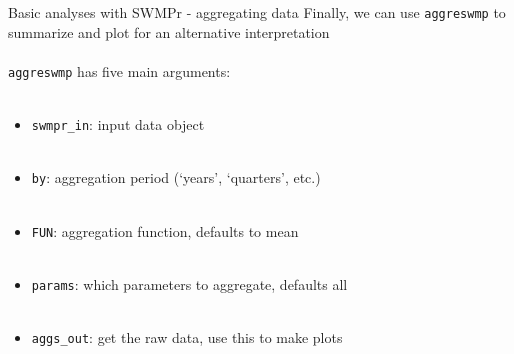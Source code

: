 \documentclass[xcolor=dvipsnames,serif]{beamer}\usepackage[]{graphicx}\usepackage[]{color}
\begin{document}
\begin{frame}[containsverbatim]{Basic analyses with SWMPr - aggregating data}
Finally, we can use \texttt{aggreswmp} to summarize and plot for an alternative interpretation \\~\\
\texttt{aggreswmp} has five main arguments: \\~\\
\begin{itemize}
\item \texttt{swmpr\_in}: input data object \\~\\
\item \texttt{by}: aggregation period (`years', `quarters', etc.) \\~\\
\item \texttt{FUN}: aggregation function, defaults to mean \\~\\
\item \texttt{params}: which parameters to aggregate, defaults all \\~\\
\item \texttt{aggs\_out}: get the raw data, use this to make plots
\end{itemize}
\end{frame}
\end{document}
